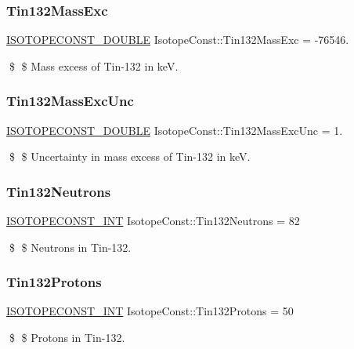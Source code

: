 \subsubsection{\texorpdfstring{Tin132\+Mass\+Exc}{Tin132MassExc}}
{\footnotesize\ttfamily \mbox{\hyperlink{group___isotope_const-_macros_ga8f45a7272ce02c0b4c65c44636ed719a}{I\+S\+O\+T\+O\+P\+E\+C\+O\+N\+S\+T\+\_\+\+D\+O\+U\+B\+LE}} Isotope\+Const\+::\+Tin132\+Mass\+Exc = -\/76546.}

\$ \$ Mass excess of Tin-\/132 in keV. \mbox{\label{group___isotope_const-_tin-_sn132_ga3e91728acc46fed4225e7e1bfa809f6c}} 
\subsubsection{\texorpdfstring{Tin132\+Mass\+Exc\+Unc}{Tin132MassExcUnc}}
{\footnotesize\ttfamily \mbox{\hyperlink{group___isotope_const-_macros_ga8f45a7272ce02c0b4c65c44636ed719a}{I\+S\+O\+T\+O\+P\+E\+C\+O\+N\+S\+T\+\_\+\+D\+O\+U\+B\+LE}} Isotope\+Const\+::\+Tin132\+Mass\+Exc\+Unc = 1.}

\$ \$ Uncertainty in mass excess of Tin-\/132 in keV. \mbox{\label{group___isotope_const-_tin-_sn132_gab05fe213b0107a568f2e9760ae4815f3}} 
\subsubsection{\texorpdfstring{Tin132\+Neutrons}{Tin132Neutrons}}
{\footnotesize\ttfamily \mbox{\hyperlink{group___isotope_const-_macros_ga5f18360b3e99483a35c32d789e62621c}{I\+S\+O\+T\+O\+P\+E\+C\+O\+N\+S\+T\+\_\+\+I\+NT}} Isotope\+Const\+::\+Tin132\+Neutrons = 82}

\$ \$ Neutrons in Tin-\/132. \mbox{\label{group___isotope_const-_tin-_sn132_gab05ecc191597039a3567bc42db534ae1}} 
\subsubsection{\texorpdfstring{Tin132\+Protons}{Tin132Protons}}
{\footnotesize\ttfamily \mbox{\hyperlink{group___isotope_const-_macros_ga5f18360b3e99483a35c32d789e62621c}{I\+S\+O\+T\+O\+P\+E\+C\+O\+N\+S\+T\+\_\+\+I\+NT}} Isotope\+Const\+::\+Tin132\+Protons = 50}

\$ \$ Protons in Tin-\/132. 